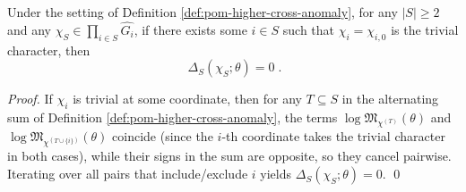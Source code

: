\begin{proposition}\label{prop:pom-cross-anom-support-constraint}
Under the setting of Definition \ref{def:pom-higher-cross-anomaly}, for any \(|S|\ge 2\) and any \(\chi_S\in\prod_{i\in S}\widehat{G_i}\), if there exists some \(i\in S\) such that \(\chi_i=\chi_{i,0}\) is the trivial character, then
\[
\boxed{\;
\Delta_S(\chi_S;\theta)=0\; }.
\]
\end{proposition}
\begin{proof}
If \(\chi_i\) is trivial at some coordinate, then for any \(T\subseteq S\) in the alternating sum of Definition \ref{def:pom-higher-cross-anomaly},
the terms \(\log\mathfrak{M}_{\chi^{(T)}}(\theta)\) and \(\log\mathfrak{M}_{\chi^{(T\cup\{i\})}}(\theta)\) coincide (since the \(i\)-th coordinate takes the trivial character in both cases), while their signs in the sum are opposite, so they cancel pairwise.
Iterating over all pairs that include/exclude \(i\) yields \(\Delta_S(\chi_S;\theta)=0\). \qed
\end{proof}

